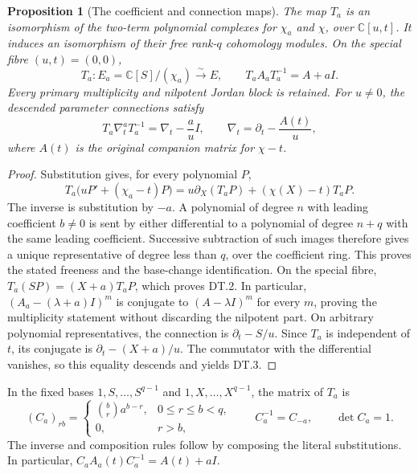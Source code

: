 \documentclass[11pt,a4paper]{article}
\newtheorem{proposition}{Proposition}
\begin{document}
\begin{proposition}[The coefficient and connection maps]
The map \(T_a\) is an isomorphism of the two-term polynomial complexes
for \(\chi_a\) and \(\chi\), over \(\mathbb C[u,t]\). It induces an
isomorphism of their free rank-\(q\) cohomology modules. On the special
fibre \((u,t)=(0,0)\),
\begin{equation}\tag{DT.2}
 T_a:E_a=\mathbb C[S]/(\chi_a)\xrightarrow{\sim}E,
 \qquad T_aA_aT_a^{-1}=A+aI.
\end{equation}
Every primary multiplicity and nilpotent Jordan block is retained.
For \(u\ne0\), the descended parameter connections satisfy
\begin{equation}\tag{DT.3}
 T_a\nabla_t^a T_a^{-1}=\nabla_t-\frac a u I,
 \qquad \nabla_t=\partial_t-\frac{A(t)}u,
\end{equation}
where \(A(t)\) is the original companion matrix for \(\chi-t\).
\end{proposition}
\begin{proof}
Substitution gives, for every polynomial \(P\),
\[
 T_a\bigl(uP'+(\chi_a-t)P\bigr)
   =u\partial_X(T_aP)+(\chi(X)-t)T_aP.
\]
The inverse is substitution by \(-a\). A polynomial of degree \(n\)
with leading coefficient \(b\ne0\) is sent by either differential to
a polynomial of degree \(n+q\) with the same leading coefficient.
Successive subtraction of such images therefore gives a unique
representative of degree less than \(q\), over the coefficient ring.
This proves the stated freeness and the base-change identification.
On the special fibre, \(T_a(SP)=(X+a)T_aP\), which proves DT.2.
In particular, \((A_a-(\lambda+a)I)^m\) is conjugate to
\((A-\lambda I)^m\) for every \(m\), proving the multiplicity statement
without discarding the nilpotent part. On arbitrary polynomial
representatives, the connection is \(\partial_t-S/u\). Since \(T_a\)
is independent of \(t\), its conjugate is
\(\partial_t-(X+a)/u\). The commutator with the differential vanishes,
so this equality descends and yields DT.3.
\end{proof}

In the fixed bases \(1,S,\ldots,S^{q-1}\) and
\(1,X,\ldots,X^{q-1}\), the matrix of \(T_a\) is
\begin{equation}\tag{DT.4}
 (C_a)_{rb}=\begin{cases}\binom br a^{b-r},&0\le r\le b<q,\\
                  0,&r>b,\end{cases}
 \qquad C_a^{-1}=C_{-a},\qquad \det C_a=1.
\end{equation}
The inverse and composition rules follow by composing the literal
substitutions. In particular,
\(C_aA_a(t)C_a^{-1}=A(t)+aI\).
\end{document}
